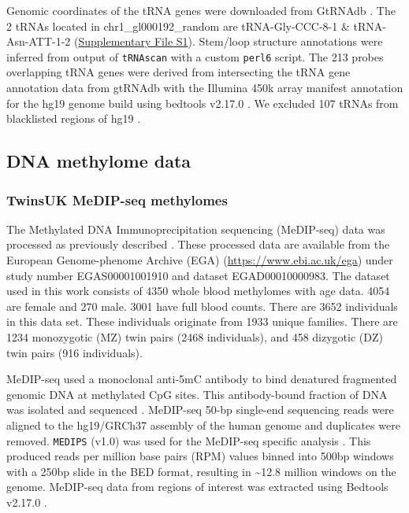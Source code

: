 \documentclass[]{book}
\begin{document}
Genomic coordinates of the tRNA genes were downloaded from GtRNAdb \citep{Chan2009}.
The 2 tRNAs located in chr1\_gl000192\_random are tRNA-Gly-CCC-8-1 \& tRNA-Asn-ATT-1-2 (\href{./Supplementary_Files/hg19-tRNAs.bed}{Supplementary File S1}).
Stem/loop structure annotations were inferred from output of \texttt{tRNAscan} \citep{Lowe2016} with a custom \texttt{perl6} script.
The 213 probes overlapping tRNA genes were derived from intersecting the tRNA gene annotation data from gtRNAdb with the Illumina 450k array manifest annotation for the hg19 genome build using bedtools v2.17.0 \citep{Quinlan2010}.
We excluded 107 tRNAs from blacklisted regions of hg19 \citep{Amemiya2019}.

\hypertarget{dna-methylome-data}{%
\subsection{DNA methylome data}\label{dna-methylome-data}}

\hypertarget{EpiTwinsMethods}{%
\subsubsection{TwinsUK MeDIP-seq methylomes}\label{EpiTwinsMethods}}

The Methylated DNA Immunoprecipitation sequencing (MeDIP-seq) data was processed as previously described \citep{Bell2016, Bell2017a}.
These processed data are available from the European Genome-phenome Archive (EGA) (\url{https://www.ebi.ac.uk/ega}) under study number EGAS00001001910 and dataset EGAD00010000983.
The dataset used in this work consists of 4350 whole blood methylomes with age data.
4054 are female and 270 male.
3001 have full blood counts.
There are 3652 individuals in this data set.
These individuals originate from 1933 unique families.
There are 1234 monozygotic (MZ) twin pairs (2468 individuals), and 458 dizygotic (DZ) twin pairs (916 individuals).

MeDIP-seq used a monoclonal anti-5mC antibody to bind denatured fragmented genomic DNA at methylated CpG sites.
This antibody-bound fraction of DNA was isolated and sequenced \citep{Down2009}.
MeDIP-seq 50-bp single-end sequencing reads were aligned to the hg19/GRCh37 assembly of the human genome and duplicates were removed.
\texttt{MEDIPS} (v1.0) was used for the MeDIP-seq specific analysis \citep{Lienhard2014}.
This produced reads per million base pairs (RPM) values binned into 500bp windows with a 250bp slide in the BED format, resulting in \textasciitilde12.8 million windows on the genome.
MeDIP-seq data from regions of interest was extracted using Bedtools v2.17.0 \citep{Quinlan2010}.
\end{document}
